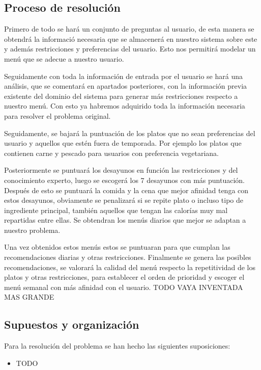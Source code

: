 \documentclass[11pt]{article}
\begin{document}
\subsection{Proceso de resolución}

Primero de todo se hará un conjunto de preguntas al usuario, de esta manera se obtendrá la informació necesaria que se almacenerá en nuestro sistema sobre este y además restricciones y preferencias del usuario. Esto nos permitirá modelar un menú que se adecue a nuestro usuario.

Seguidamente con toda la información de entrada por el usuario se hará una análisis, que se comentará en apartados posteriores, con la información previa existente del dominio del sistema para generar más restricciones respecto a nuestro menú. Con esto ya habremos adquirido toda la información necesaria para resolver el problema original.

Seguidamente, se bajará la puntuación de los platos que no sean preferencias del usuario y aquellos que estén fuera de temporada. Por ejemplo los platos que contienen carne y pescado para usuarios con preferencia vegetariana. 

Posteriormente se puntuará los desayunos en función las restricciones y del conocimiento experto, luego se escogerá los 7 desayunos con más puntuación. Después de esto se puntuará la comida y la cena que mejor afinidad tenga con estos desayunos, obviamente se penalizará si se repite plato o incluso tipo de ingrediente principal, también aquellos que tengan las calorías muy mal repartidas entre ellas. Se obtendran los menús diarios que mejor se adaptan a nuestro problema.

Una vez obtenidos estos menús estos se puntuaran para que cumplan las recomendaciones diarias y otras restricciones. Finalmente se genera las posibles recomendaciones, se valorará la calidad del menú respecto la repetitividad de los platos y otras restricciones, para establecer el orden de prioridad y escoger el menú semanal con más afinidad con el usuario. TODO VAYA INVENTADA MAS GRANDE

\subsection{Supuestos y organización}

Para la resolución del problema se han hecho las siguientes suposiciones:
\begin{itemize}
    \item TODO
\end{itemize}
\end{document}

